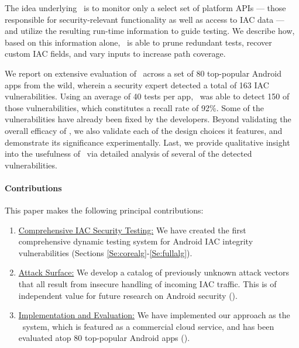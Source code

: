 The idea underlying \Tool\ is to monitor only a select set of platform APIs --- those responsible for security-relevant functionality as well as access to IAC data --- and utilize the resulting run-time information to guide testing. We describe how, based on this information alone, \Tool\ is able to prune redundant tests, recover custom IAC fields, and vary inputs to increase path coverage.  

We report on extensive evaluation of \Tool\ across a set of 80 top-popular Android apps from the wild, wherein a security expert detected a total of 163 IAC vulnerabilities. 
Using an average of 40 tests per app, \Tool\ was able to detect 150 of those vulnerabilities, which constitutes a recall rate of 92\%. Some of the vulnerabilities have already been fixed by the developers. Beyond validating the overall efficacy of \Tool, we also validate each of the design choices it features, and demonstrate its significance experimentally. Last, we provide qualitative insight into the usefulness of \Tool\ via detailed analysis of several of the detected vulnerabilities.

\paragraph{Contributions} This paper makes the following principal contributions:
\begin{enumerate}
	\item \underline{Comprehensive IAC Security Testing:} We have created the first comprehensive dynamic testing system for Android IAC integrity vulnerabilities (Sections \ref{Se:corealg}-\ref{Se:fullalg}).
	\item \underline{Attack Surface:} We develop a catalog of previously unknown attack vectors that all result from insecure handling of incoming IAC traffic. This is of independent value for future research on Android security (). 
	\item \underline{Implementation and Evaluation:} We have implemented our approach as the \Tool\ system, which is featured as a commercial cloud service, and has been evaluated atop 80 top-popular Android apps ().
\end{enumerate}


 